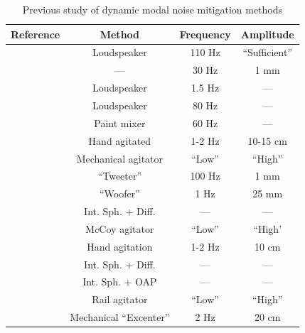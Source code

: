 \documentclass[twocolumn]{emulateapj}
\begin{document}
\begin{table}
\centering
\caption{Previous study of dynamic modal noise mitigation methods}
	\begin{tabular}{cccc}
		\hline
		Reference & Method & Frequency & Amplitude \\
		\hline\hline
		\citet{Daino1980} & Loudspeaker & 110 Hz & ``Sufficient'' \\
		\hline
		\citet{Baudrand2001} & --- & 30 Hz & 1 mm \\
		\hline
		\multirow{2}{*}{\citet{Lemke2011}} & Loudspeaker & 1.5 Hz & --- \\
		 & Loudspeaker & 80 Hz & --- \\
		\hline
		\multirow{3}{*}{\citet{McCoy2012}} & Paint mixer & 60 Hz & --- \\
		 & Hand agitated & 1-2 Hz & 10-15 cm \\
		 & Mechanical agitator & ``Low'' & ``High''\\
		\hline
		\multirow{2}{*}{\citet{Plavchan2013}} & ``Tweeter'' & 100 Hz & 1 mm \\
		 & ``Woofer'' & 1 Hz & 25 mm \\
		\hline
		\multirow{3}{*}{\citet{Mahadevan2014}} & Int. Sph. + Diff. & --- & ---\\
		 & McCoy agitator & ``Low'' & ``High' \\
		 & Hand agitation & 1-2 Hz & 10 cm \\
		\hline
		\multirow{2}{*}{\citet{Halverson2014}} & Int. Sph. + Diff. & --- & --- \\
		 & Int. Sph. + OAP & --- & --- \\
		\hline		
		\citet{Roy2014} & Rail agitator & ``Low'' & ``High'' \\
		\hline
		\citet{Sablowski2015} & Mechanical ``Excenter''& 2 Hz & 20 cm \\
		\hline
	\end{tabular}
\label{table:previous_studies}
\end{table}
\end{document}
